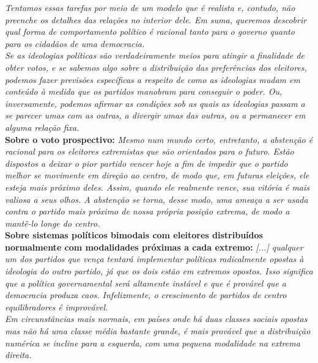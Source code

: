 \textit{Tentamos essas tarefas por meio de um modelo que é realista e, contudo, não preenche os detalhes das relações no interior dele. Em suma, queremos descobrir qual forma de comportamento político é racional tanto para o governo quanto para os cidadãos de uma democracia.} \cite[~p. 41-42]{downs} \\

\noindent \textit{Se as ideologias políticas são verdadeiramente meios para atingir a finalidade de obter votos, e se sabemos algo sobre a distribuição das preferências dos eleitores, podemos fazer previsões específicas a respeito de como as ideologias mudam em conteúdo à medida que os partidos manobram para conseguir o poder. Ou, inversamente, podemos afirmar as condições sob as quais as ideologias passam a se parecer umas com as outras, a divergir umas das outras, ou a permanecer em alguma relação fixa.} \cite[~p. 135]{downs} \\

\noindent \textbf{Sobre o voto prospectivo:} \textit{Mesmo num mundo certo, entretanto, a abstenção é racional para os eleitores extremistas que são orientados para o futuro. Estão dispostos a deixar o pior partido vencer hoje a fim de impedir que o partido melhor se movimente em direção ao centro, de modo que, em futuras eleições, ele esteja mais próximo deles. Assim, quando ele realmente vence, sua vitória é mais valiosa a seus olhos. A abstenção se torna, desse modo, uma ameaça a ser usada contra o partido mais próximo de nossa própria posição extrema, de modo a mantê-lo longe do centro.} \cite[~p. 140]{downs} \\

\noindent \textbf{Sobre sistemas políticos bimodais com eleitores distribuídos normalmente com modalidades próximas a cada extremo:} \textit{[...] qualquer um dos partidos que vença tentará implementar políticas radicalmente opostas à ideologia do outro partido, já que os dois estão em extremos opostos. Isso significa que a política governamental será altamente instável e que é provável que a democracia produza caos. Infelizmente, o crescimento de partidos de centro equilibradores é improvável.} \cite[~p. 141]{downs} \\

\noindent \textit{Em circunstâncias mais normais, em países onde há duas classes sociais opostas mas não há uma classe média bastante grande, é mais provável que a distribuição numérica se incline para a esquerda, com uma pequena modalidade na extrema direita.} \cite[~p. 142]{downs} \\

